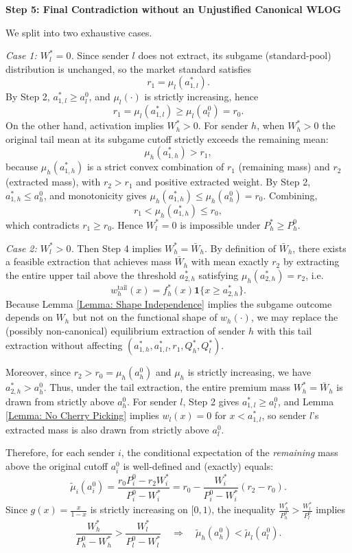 \documentclass[12pt, a4paper]{article}
\begin{document}
\textbf{Step 5: Final Contradiction without an Unjustified Canonical WLOG}

We split into two exhaustive cases.

\medskip
\noindent\textit{Case 1: $W_l^* = 0$.}
Since sender $l$ does not extract, its subgame (standard-pool) distribution is unchanged, so the market standard satisfies
\[
r_1 = \mu_l(a_{1,l}^*).
\]
By Step 2, $a_{1,l}^* \ge a_l^0$, and $\mu_l(\cdot)$ is strictly increasing, hence
\[
r_1=\mu_l(a_{1,l}^*) \ge \mu_l(a_l^0)=r_0.
\]
On the other hand, activation implies $W_h^*>0$. For sender $h$, when $W_h^*>0$ the original tail mean at its subgame cutoff strictly exceeds the remaining mean:
\[
\mu_h(a_{1,h}^*) > r_1,
\]
because $\mu_h(a_{1,h}^*)$ is a strict convex combination of $r_1$ (remaining mass) and $r_2$ (extracted mass), with $r_2>r_1$ and positive extracted weight. By Step 2, $a_{1,h}^* \le a_h^0$, and monotonicity gives $\mu_h(a_{1,h}^*) \le \mu_h(a_h^0)=r_0$. Combining,
\[
r_1 < \mu_h(a_{1,h}^*) \le r_0,
\]
which contradicts $r_1 \ge r_0$. Hence $W_l^*=0$ is impossible under $P_h^*\ge P_h^0$.

\medskip
\noindent\textit{Case 2: $W_l^* > 0$.}
Then Step 4 implies $W_h^*=\bar W_h$. By definition of $\bar W_h$, there exists a feasible extraction that achieves mass $\bar W_h$ with mean exactly $r_2$ by extracting the entire upper tail above the threshold $a_{2,h}^*$ satisfying $\mu_h(a_{2,h}^*)=r_2$, i.e.
\[
w_h^{\text{tail}}(x)=f_h^*(x)\mathbf 1\{x\ge a_{2,h}^*\}.
\]
Because Lemma \ref{Lemma: Shape Independence} implies the subgame outcome depends on $W_h$ but not on the functional shape of $w_h(\cdot)$, we may replace the (possibly non-canonical) equilibrium extraction of sender $h$ with this tail extraction without affecting $(a_{1,h}^*,a_{1,l}^*,r_1,Q_h^*,Q_l^*)$.

Moreover, since $r_2>r_0=\mu_h(a_h^0)$ and $\mu_h$ is strictly increasing, we have $a_{2,h}^*>a_h^0$. Thus, under the tail extraction, the entire premium mass $W_h^*=\bar W_h$ is drawn from strictly above $a_h^0$. For sender $l$, Step 2 gives $a_{1,l}^*\ge a_l^0$, and Lemma \ref{Lemma: No Cherry Picking} implies $w_l(x)=0$ for $x<a_{1,l}^*$, so sender $l$'s extracted mass is also drawn from strictly above $a_l^0$.

Therefore, for each sender $i$, the conditional expectation of the \emph{remaining} mass above the original cutoff $a_i^0$ is well-defined and (exactly) equals:
\[
\tilde{\mu}_i(a_i^0)=\frac{r_0P_i^0-r_2W_i^*}{P_i^0-W_i^*}
= r_0-\frac{W_i^*}{P_i^0-W_i^*}(r_2-r_0).
\]
Since $g(x)=\frac{x}{1-x}$ is strictly increasing on $[0,1)$, the inequality $\frac{W_h^*}{P_h^0}>\frac{W_l^*}{P_l^0}$ implies
\[
\frac{W_h^*}{P_h^0-W_h^*}>\frac{W_l^*}{P_l^0-W_l^*}
\quad\Rightarrow\quad
\tilde{\mu}_h(a_h^0)<\tilde{\mu}_l(a_l^0).
\]
\end{document}
